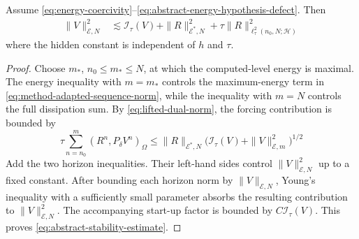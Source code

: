 \documentclass[11pt]{article}
\begin{document}
\begin{thm}
\label{thm:meta-stability}\label{thm:stability-meta}
Assume \eqref{eq:energy-coercivity}--\eqref{eq:abstract-energy-hypothesis-defect}.
Then
\begin{align}
\|V\|_{\mathcal E,N}^2
&\lesssim\mathcal I_{\tau}(V)
+\|R\|_{\mathcal E^*,N}^2
+\tau\|R\|_{\ell_{\tau}^2(n_0,N;\mathcal H)}^2 \label{eq:abstract-stability-estimate}
\end{align}
where the hidden constant is independent of \(h\) and \(\tau\).
\end{thm}
\begin{proof}
Choose \(m_*\), \(n_0\le m_*\le N\), at which the computed-level energy is
maximal. The energy inequality with \(m=m_*\) controls the maximum-energy
term in \eqref{eq:method-adapted-sequence-norm}, while the inequality with
\(m=N\) controls the full dissipation sum. By
\eqref{eq:lifted-dual-norm}, the forcing contribution is bounded by
\begin{equation}
\tau\sum_{n=n_0}^{m}(R^n,P_{\delta}V^n)_{\Omega}
\le\|R\|_{\mathcal E^*,N}
\bigl(\mathcal I_{\tau}(V)+\|V\|_{\mathcal E,m}^2\bigr)^{1/2}
\label{eq:dual-forcing-bound}
\end{equation}
Add the two horizon inequalities. Their left-hand sides control
\(\|V\|_{\mathcal E,N}^2\) up to a fixed constant. After bounding each horizon
norm by \(\|V\|_{\mathcal E,N}\), Young's inequality with a sufficiently small
parameter absorbs the resulting contribution to
\(\|V\|_{\mathcal E,N}^2\). The accompanying start-up factor is bounded by
\(C\mathcal I_{\tau}(V)\). This proves
\eqref{eq:abstract-stability-estimate}.
\end{proof}

\end{document}
